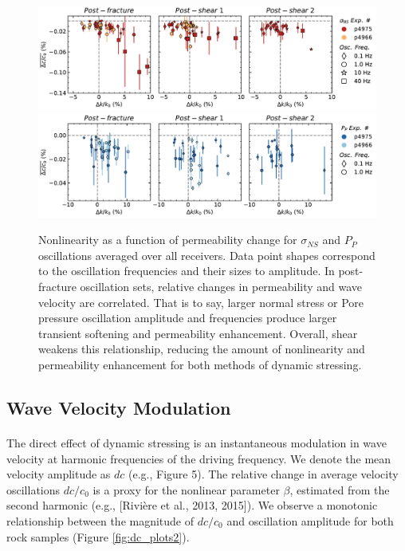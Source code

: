 \documentclass[letterpaper,10pt]{article}
\begin{document}
\begin{figure}[ht]
	\centering
	\includegraphics[width=1\columnwidth]{avgDelc_All_ampsNS}
	\includegraphics[width=1\columnwidth]{avgDelc_All_ampsPP}
	\caption{Nonlinearity as a function of permeability change for $ \sigma_{NS} $ and $ P_P $ oscillations averaged over all receivers. Data point shapes correspond to the oscillation frequencies and their sizes to amplitude. In post-fracture oscillation sets, relative changes in permeability and wave velocity are correlated. That is to say, larger normal stress or Pore pressure oscillation amplitude and frequencies produce larger transient softening and permeability enhancement. Overall, shear weakens this relationship, reducing the amount of nonlinearity and permeability enhancement for both methods of dynamic stressing. }
	\label{fig:delc_plots2}
\end{figure}

\clearpage

\subsection{Wave Velocity Modulation}
\paragraph{}
The direct effect of dynamic stressing is an instantaneous modulation in wave velocity at harmonic frequencies of the driving frequency. We denote the mean velocity amplitude as $ dc $ (e.g., Figure 5). The relative change in average velocity oscillations $ dc/c_0 $ is a proxy for the nonlinear parameter $ \beta $, estimated from the second harmonic (e.g., [Rivi\`ere et al., 2013, 2015]). We observe a monotonic relationship between the magnitude of $ dc/c_0 $ and oscillation amplitude for both rock samples (Figure \ref{fig:dc_plots2}).
\end{document}
